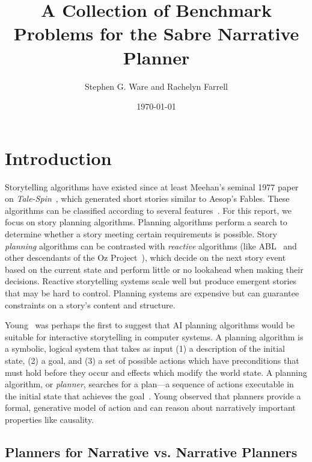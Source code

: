 \documentclass{nilreport}
\title{A Collection of Benchmark Problems for the Sabre Narrative Planner}
\author{Stephen G. Ware and Rachelyn Farrell}
\date{\today}
\begin{document}
\maketitle

\tableofcontents

\newpage


\section{Introduction}

Storytelling algorithms have existed since at least Meehan's seminal
1977 paper on \emph{Tale-Spin}~\cite{meehan1977tale}, which generated
short stories similar to Aesop's Fables. These algorithms can be classified
according to several features~\cite{kybartas2016survey}. For this
report, we focus on story planning algorithms. Planning algorithms
perform a search to determine whether a story meeting certain requirements
is possible. Story \emph{planning} algorithms can be contrasted with
\emph{reactive} algorithms (like ABL~\cite{mateas2004behavior} and
other descendants of the Oz Project~\cite{mateas2001oz}), which
decide on the next story event based on the current state and perform
little or no lookahead when making their decisions. Reactive storytelling
systems scale well but produce emergent stories that may be hard to
control. Planning systems are expensive but can guarantee constraints
on a story's content and structure.

Young~\cite{young1999notes} was perhaps the first to suggest that
AI planning algorithms would be suitable for interactive storytelling
in computer systems. A planning algorithm is a symbolic, logical system
that takes as input (1) a description of the initial state, (2) a
goal, and (3) a set of possible actions which have preconditions that
must hold before they occur and effects which modify the world state.
A planning algorithm, or \emph{planner}, searches for a plan---a
sequence of actions executable in the initial state that achieves
the goal~\cite{weld1999recent}. Young observed that planners provide
a formal, generative model of action and can reason about narratively
important properties like causality.

\subsection{Planners for Narrative vs. Narrative Planners}
\end{document}
